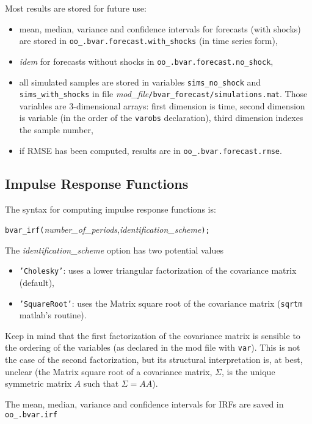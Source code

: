 \documentclass[11pt,a4paper]{article}
\begin{document}
Most results are stored for future use:
\begin{itemize}
\item mean, median, variance and confidence intervals for forecasts (with shocks) are stored in \texttt{oo\_.bvar.forecast.with\_shocks} (in time series form),
\item \textit{idem} for forecasts without shocks in \texttt{oo\_.bvar.forecast.no\_shock},
\item all simulated samples are stored in variables \texttt{sims\_no\_shock} and \texttt{sims\_with\_shocks} in file \textit{mod\_file}\texttt{/bvar\_forecast/simulations.mat}. Those variables are 3-dimensional arrays: first dimension is time, second dimension is variable (in the order of the \texttt{varobs} declaration), third dimension indexes the sample number,
\item if RMSE has been computed, results are in \texttt{oo\_.bvar.forecast.rmse}.
\end{itemize}

\subsection{Impulse Response Functions}

The syntax for computing impulse response functions is:

\medskip
\texttt{bvar\_irf(}\textit{number\_of\_periods},\textit{identification\_scheme}\texttt{);}
\medskip

The \textit{identification\_scheme} option has two potential values
\begin{itemize}
\item \texttt{'Cholesky'}: uses a lower triangular factorization of the covariance matrix (default),
\item \texttt{'SquareRoot'}: uses the Matrix square root of the covariance matrix (\verb+sqrtm+ matlab's routine).
\end{itemize}

Keep in mind that the first factorization of the covariance matrix is sensible to the ordering of the variables (as declared in the mod file with \verb+var+). This is not the case of the second factorization, but its structural interpretation is, at best, unclear (the Matrix square root of a covariance matrix, $\Sigma$, is the unique symmetric matrix $A$ such that $\Sigma = AA$).\newline

The mean, median, variance and confidence intervals for IRFs are saved in \texttt{oo\_.bvar.irf}
\end{document}
